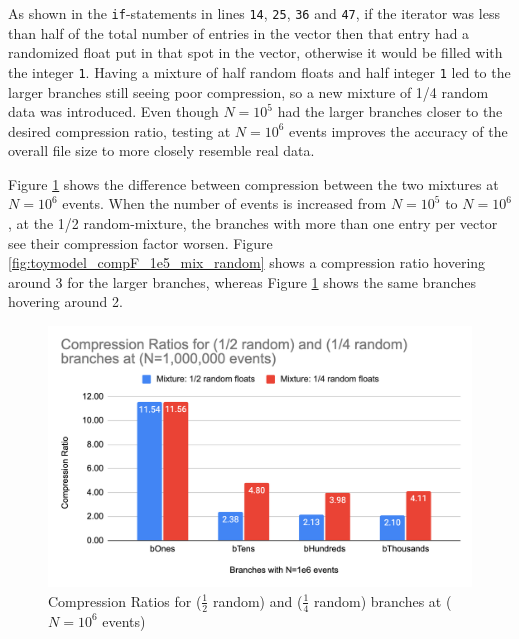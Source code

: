 As shown in the \verb|if|-statements in lines \verb|14|, \verb|25|, \verb|36| and \verb|47|, if the iterator was less than half of the total number of entries in the vector then that entry had a randomized float put in that spot in the vector, otherwise it would be filled with the integer \verb|1|.
Having a mixture of half random floats and half integer \verb|1| led to the larger branches still seeing poor compression, so a new mixture of 1/4 random data was introduced. 
Even though $N=10^5$ had the larger branches closer to the desired compression ratio, testing at $N=10^6$ events improves the accuracy of the overall file size to more closely resemble real data.

Figure \ref{fig:toymodel_compF_1e6_mix_random} shows the difference between compression between the two mixtures at $N=10^6$ events. 
When the number of events is increased from $N=10^5$ to $N=10^6$, at the 1/2 random-mixture, the branches with more than one entry per vector see their compression factor worsen. 
Figure \ref{fig:toymodel_compF_1e5_mix_random} shows a compression ratio hovering around 3 for the larger branches, whereas Figure \ref{fig:toymodel_compF_1e6_mix_random} shows the same branches hovering around 2. 

\begin{figure}[h]
    \centering
    \includegraphics[width=.8\textwidth]{content/toymodel_content/Compression Ratios for (1_2 random) and (1_4 random) branches at (N=1,000,000 events).png}
    \caption{Compression Ratios for ($\frac{1}{2}$ random) and ($\frac{1}{4}$ random) branches at ($N=10^6$ events)}
    \label{fig:toymodel_compF_1e6_mix_random}
\end{figure}

